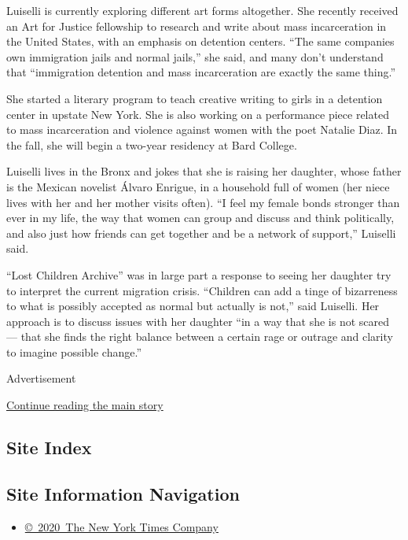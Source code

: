 Luiselli is currently exploring different art forms altogether. She
recently received an Art for Justice fellowship to research and write
about mass incarceration in the United States, with an emphasis on
detention centers. ``The same companies own immigration jails and normal
jails,'' she said, and many don't understand that ``immigration
detention and mass incarceration are exactly the same thing.''

She started a literary program to teach creative writing to girls in a
detention center in upstate New York. She is also working on a
performance piece related to mass incarceration and violence against
women with the poet Natalie Diaz. In the fall, she will begin a two-year
residency at Bard College.

Luiselli lives in the Bronx and jokes that she is raising her daughter,
whose father is the Mexican novelist Álvaro Enrigue, in a household full
of women (her niece lives with her and her mother visits often). ``I
feel my female bonds stronger than ever in my life, the way that women
can group and discuss and think politically, and also just how friends
can get together and be a network of support,'' Luiselli said.

``Lost Children Archive'' was in large part a response to seeing her
daughter try to interpret the current migration crisis. ``Children can
add a tinge of bizarreness to what is possibly accepted as normal but
actually is not,'' said Luiselli. Her approach is to discuss issues with
her daughter ``in a way that she is not scared --- that she finds the
right balance between a certain rage or outrage and clarity to imagine
possible change.''

Advertisement

\protect\hyperlink{after-bottom}{Continue reading the main story}

\hypertarget{site-index}{%
\subsection{Site Index}\label{site-index}}

\hypertarget{site-information-navigation}{%
\subsection{Site Information
Navigation}\label{site-information-navigation}}

\begin{itemize}
\tightlist
\item
  \href{https://help.nytimes3xbfgragh.onion/hc/en-us/articles/115014792127-Copyright-notice}{©~2020~The
  New York Times Company}
\end{itemize}

